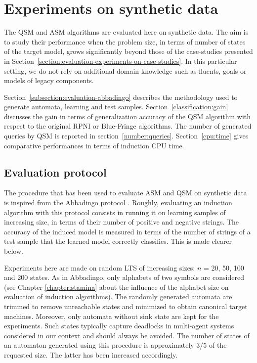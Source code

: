 \section{Experiments on synthetic data\label{section:evaluation-experiments-on-synthetic-data}}

The QSM and ASM algorithms are evaluated here on synthetic data. The aim is to study their performance when the problem size, in terms of number of states of the target model, grows significantly beyond those of the case-studies presented in Section~\ref{section:evaluation-experiments-on-case-studies}. In this particular setting, we do not rely on additional domain knowledge such as fluents, goals or models of legacy components.

Section~\ref{subsection:evaluation-abbadingo} describes the methodology used to generate automata, learning and test samples. Section~\ref{classification:gain} discusses the gain in terms of generalization accuracy of the QSM algorithm with respect to the original RPNI or Blue-Fringe algorithms. The number of generated queries by QSM is reported in section~\ref{number:queries}. Section~\ref{cpu:time} gives comparative performances in terms of induction CPU time.

\subsection{Evaluation protocol\label{subsection:evaluation-synthetic-protocol}}

The procedure that has been used to evaluate ASM and QSM on synthetic data is inspired from the Abbadingo protocol \cite{Lang:1998}. Roughly, evaluating an induction algorithm with this protocol consists in running it on learning samples of increasing size, in terms of their number of positive and negative strings. The accuracy of the induced model is measured in terms of the number of strings of a test sample that the learned model correctly classifies. This is made clearer below.

Experiments here are made on random LTS of increasing sizes: $n$ = 20, 50, 100 and 200 states. As in Abbadingo, only alphabets of two symbols are considered (see Chapter \ref{chapter:stamina} about the influence of the alphabet size on evaluation of induction algorithms). The randomly generated automata are trimmed to remove unreachable states and minimized to obtain canonical target machines. Moreover, only automata without sink state are kept for the experiments. Such states typically capture deadlocks in multi-agent systems considered in our context and should always be avoided. The number of states of an automaton generated using this procedure is approximately 3/5 of the requested size. The latter has been increased accordingly.

